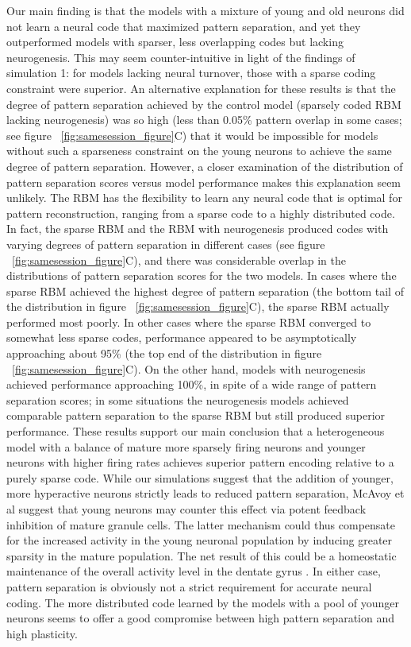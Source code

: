 Our main finding is that the models with a mixture of young and old 
neurons did not learn a neural code that maximized pattern separation, 
and yet they outperformed models with sparser, less overlapping 
codes but lacking neurogenesis. 
This may seem counter-intuitive in light of the findings of 
simulation 1: for models lacking neural turnover, those with a sparse coding constraint 
were superior. 
An alternative explanation for these results is that the degree of pattern 
separation achieved by the control model (sparsely coded \ac{RBM} lacking neurogenesis) 
was so high (less than 0.05\% pattern overlap in some cases; see 
figure ~\ref{fig:samesession_figure}C) that it would be impossible 
for models without such a sparseness constraint on the young 
neurons to achieve the same degree of pattern separation. 
However, a closer examination 
of the distribution of pattern separation scores versus model performance makes this explanation 
seem unlikely. 
The \ac{RBM} has the flexibility to learn any neural code that is optimal for pattern 
reconstruction, ranging from a sparse code to a highly distributed code. 
In fact, the sparse \ac{RBM} 
and the \ac{RBM} with neurogenesis produced codes with varying degrees of pattern separation in 
different cases (see figure ~\ref{fig:samesession_figure}C), 
and there was considerable overlap in the distributions of pattern 
separation scores for the two models. 
In cases where the sparse \ac{RBM} 
achieved the highest degree of pattern separation 
(the bottom tail of the distribution in figure ~\ref{fig:samesession_figure}C), 
the sparse \ac{RBM} actually performed most poorly. 
In other cases where the sparse \ac{RBM} converged 
to somewhat less sparse codes, performance appeared to be asymptotically approaching 
about 95\% (the top end of the distribution in figure ~\ref{fig:samesession_figure}C). 
On the other hand, models with neurogenesis achieved 
performance approaching 100\%, in spite of a wide 
range of pattern separation scores; in some situations the neurogenesis models achieved 
comparable pattern separation to the sparse \ac{RBM} but still produced superior performance. 
These results support our main conclusion that a heterogeneous model with a balance of 
mature more sparsely firing neurons and younger neurons with higher firing rates achieves 
superior pattern encoding relative to a purely sparse code. 
While our simulations suggest that the addition of younger, more hyperactive neurons strictly
leads to reduced pattern separation, McAvoy et al \citeyearpar{mcavoy-et-al-15} suggest that 
young neurons may counter this effect via potent feedback inhibition of mature granule cells. 
The latter mechanism could thus compensate for the increased activity in the young 
neuronal population by inducing greater sparsity in the mature population.
The net result of this could be a homeostatic maintenance of the overall 
activity level in the dentate gyrus \citep{mcavoy-et-al-15}.
In either case, pattern separation is obviously 
not a strict requirement for accurate neural coding. 
The more distributed code learned by 
the models with a pool of younger neurons seems to offer a good compromise between 
high pattern separation and high plasticity.

